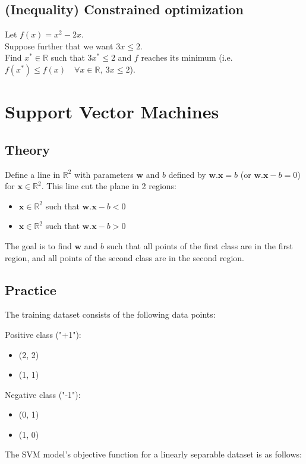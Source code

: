 \documentclass[]{article}
\newcommand{\R}{\mathbb{R}}
\begin{document}
	\subsection{(Inequality) Constrained optimization}
	Let $f(x) = x^2-2x$.\\
	Suppose further that we want $3x \leq 2$.\\
	Find $x^* \in \R$ such that $3x^* \leq 2$ and $f$ reaches its minimum (i.e. $f(x^*) \leq f(x) \quad \forall x \in \R,\ 3x \leq 2$).
	
	
	\section{Support Vector Machines}
	\subsection{Theory}
	Define a line in $\R^2$ with parameters $\mathbf{w}$ and $b$ defined by $\mathbf{w}.\mathbf{x} = b$ (or $\mathbf{w}.\mathbf{x} - b = 0$) for $\mathbf{x} \in \R^2$.
	This line cut the plane in 2 regions:
	\begin{itemize}
		\item $\mathbf{x} \in \R^2$ such that $\mathbf{w}.\mathbf{x} - b < 0$
		\item $\mathbf{x} \in \R^2$ such that $\mathbf{w}.\mathbf{x} - b > 0$
	\end{itemize}
	The goal is to find $\mathbf{w}$ and $b$ such that all points of the first class are in the first region, and all points of the second class are in the second region.
	
	
	
	
	\subsection{Practice}
	The training dataset consists of the following data points:
	
	Positive class ("+1"):
	\begin{itemize}
		\item (2, 2)
		\item (1, 1)
	\end{itemize}
	
	Negative class ("-1"):
	\begin{itemize}
		\item (0, 1)
		\item (1, 0)
	\end{itemize}
	
	The SVM model's objective function for a linearly separable dataset is as follows:
	
\end{document}
